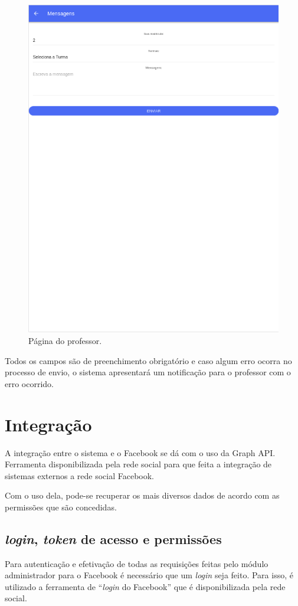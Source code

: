\begin{figure}[H]
\centering
\includegraphics[scale=0.5]{figuras/mobile2}
\caption{Página do professor.}
\label{fig:mobile3}
\end{figure}

Todos os campos são de preenchimento obrigatório e caso algum erro ocorra no processo de envio, o sistema apresentará um notificação para o professor com o erro ocorrido.

\section{Integração}
A integração entre o sistema e o Facebook se dá com o uso da Graph API. Ferramenta disponibilizada pela rede social para que feita a integração de sistemas externos a rede social Facebook.

Com o uso dela, pode-se recuperar os mais diversos dados de acordo com as permissões que são concedidas.

\subsection{\textit{login}, \textit{token} de acesso e permissões}
Para autenticação e efetivação de todas as requisições feitas pelo módulo administrador para o Facebook é necessário que um \textit{login} seja feito. Para isso, é utilizado a ferramenta de ``\textit{login} do Facebook''  que é disponibilizada pela rede social.

